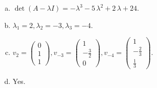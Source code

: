 \begin{questions}
\begin{solution}
\begin{enumerate}[(a)]
\item $\det(A-\lambda I)=-{\lambda}^{3} - 5 \, {\lambda}^{2} + 2 \, {\lambda} + 24$.
\item ${\lambda}_1=2, {\lambda}_2=-3, {\lambda}_3=-4$.
\item $v_{2}=\left(\begin{array}{r}
0 \\
1 \\
1
\end{array}\right), v_{-3}=\left(\begin{array}{r}
1 \\
-\frac{3}{2} \\
0
\end{array}\right), v_{-4}=\left(\begin{array}{r}
1 \\
-\frac{2}{3} \\
\frac{1}{3}
\end{array}\right)$.
\item Yes.
\end{enumerate}
\end{solution}

\end{questions}

\newpage


\begin{center}
\end{center}

